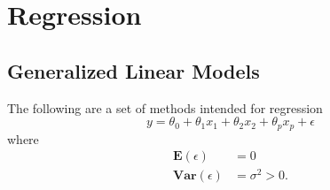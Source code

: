 \chapter{Regression}


\section{Generalized Linear Models}

The following are a set of methods intended for regression
\begin{equation}
	y = \theta_0 + \theta_1 x_1 + \theta_2 x_2 + \theta_p x_p  + \epsilon
\end{equation}
where
\begin{align*}
	\mathbf{E}(\epsilon)   &= 0\\
	\mathbf{Var}(\epsilon) &= \sigma^2>0.
\end{align*}


